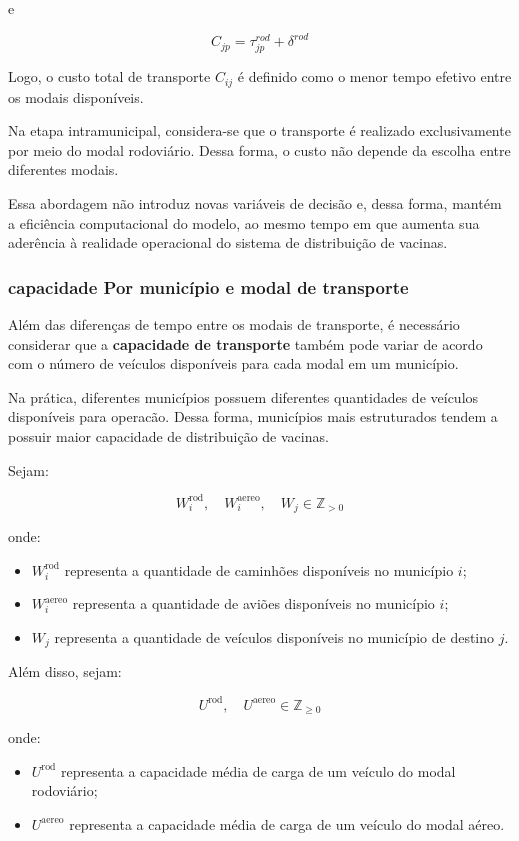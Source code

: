 e

\[
C_{jp} = \tau_{jp}^{rod} + \delta^{rod}
\]

Logo, o custo total de transporte $C_{ij}$ é definido como o menor tempo efetivo entre os modais disponíveis.

Na etapa intramunicipal, considera-se que o transporte é realizado exclusivamente por meio do modal rodoviário. Dessa forma, o custo não depende da escolha entre diferentes modais.

Essa abordagem não introduz novas variáveis de decisão e, dessa forma, mantém a eficiência computacional do modelo, ao mesmo tempo em que aumenta sua aderência à realidade operacional do sistema de distribuição de vacinas.


\subsubsection{capacidade Por município e modal de transporte}

Além das diferenças de tempo entre os modais de transporte, é necessário considerar que a \textbf{capacidade de transporte} também pode variar de acordo com o número de veículos disponíveis para cada modal em um município.

Na prática, diferentes municípios possuem diferentes quantidades de veículos disponíveis para operacão. Dessa forma, municípios mais estruturados tendem a possuir maior capacidade de distribuição de vacinas.

Sejam:

\[
W_{i}^{\text{rod}}, \quad W_{i}^{\text{aereo}}, \quad W_{j} \in \mathbb{Z}_{>0}
\]

onde:
\begin{itemize}
    \item $W_{i}^{\text{rod}}$ representa a quantidade de caminhões disponíveis no município $i$;
    \item $W_{i}^{\text{aereo}}$ representa a quantidade de aviões disponíveis no município $i$;
    \item $W_{j}$ representa a quantidade de veículos disponíveis no município de destino $j$.
\end{itemize}

Além disso, sejam:

\[
U^{\text{rod}}, \quad U^{\text{aereo}} \in \mathbb{Z}_{\ge 0}
\]

onde:
\begin{itemize}
    \item $U^{\text{rod}}$ representa a capacidade média de carga de um veículo do modal rodoviário;
    \item $U^{\text{aereo}}$ representa a capacidade média de carga de um veículo do modal aéreo.
\end{itemize}

